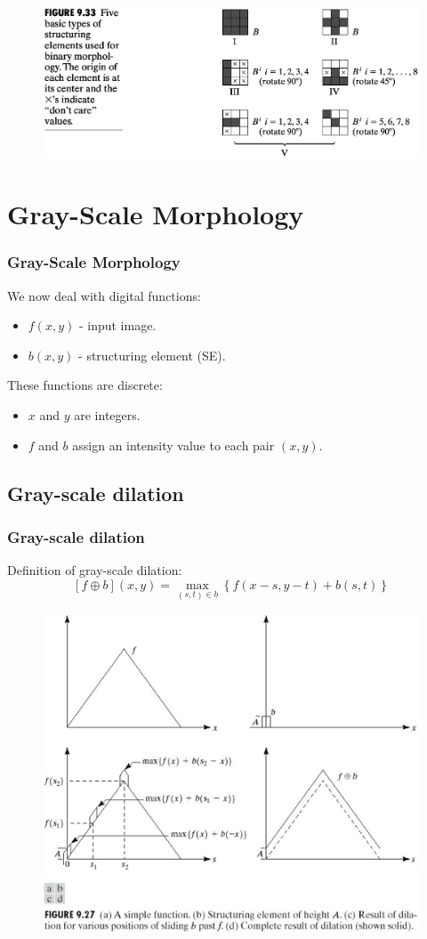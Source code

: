 \begin{frame}
\begin{figure}[!h]
\includegraphics[width=\textwidth]{fig-9-33}
\end{figure}
\end{frame}

\section{Gray-Scale Morphology}

\begin{frame}
\frametitle{Gray-Scale Morphology}
We now deal with digital functions:
\begin{itemize}
\item $f(x,y)$ - input image.
\item $b(x,y)$ - structuring element (SE).
\end{itemize}
These functions are discrete:
\begin{itemize}
\item $x$ and $y$ are integers.
\item $f$ and $b$ assign an intensity value to each pair $(x,y)$.
\end{itemize}
\end{frame}

\subsection{Gray-scale dilation}

\begin{frame}
\frametitle{Gray-scale dilation}
Definition of gray-scale dilation:
\[
\left [ f \oplus b \right ] \left ( x, y  \right ) = \max_{(s,t)\in b} \left \{ f(x-s, y-t) + b(s,t) \right \}
\]
\begin{figure}[!h]
\includegraphics[width=.5\textwidth]{gs-dilation-ex-1.png}
\end{figure}
\end{frame}

